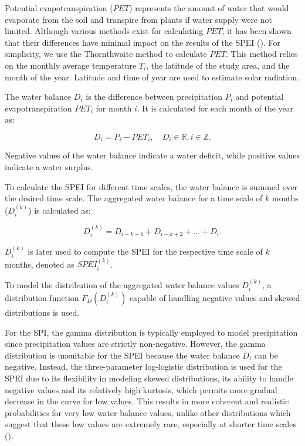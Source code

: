 \documentclass[
]{krantz}
\begin{document}
Potential evapotranspiration (\(PET\)) represents the amount of water that would evaporate from the soil and transpire from plants if water supply were not limited. Although various methods exist for calculating \(PET\), it has been shown that their differences have minimal impact on the results of the SPEI (\citet{vicente}). For simplicity, we use the Thornthwaite method to calculate \(PET\). This method relies on the monthly average temperature \(T_i\), the latitude of the study area, and the month of the year. Latitude and time of year are used to estimate solar radiation.

The water balance \(D_i\) is the difference between precipitation \(P_i\) and potential evapotranspiration \(PET_i\) for month \(i\). It is calculated for each month of the year as:

\begin{equation}
D_i = P_i - PET_i, \quad D_i \in \mathbb{R}, i \in \mathbb{Z}.
\end{equation}

Negative values of the water balance indicate a water deficit, while positive values indicate a water surplus.

To calculate the SPEI for different time scales, the water balance is summed over the desired time scale.
The aggregated water balance for a time scale of \(k\) months (\(D^{(k)}_i\)) is calculated as:

\begin{equation}
D^{(k)}_i = D_{i-k+1} + D_{i-k+2} + \ldots + D_i.
\end{equation}

\(D_i^{(k)}\) is later used to compute the SPEI for the respective time scale of \(k\) months, denoted as \(SPEI_i^{(k)}\).

To model the distribution of the aggregated water balance values \(D^{(k)}_i\), a distribution function \(F_D(D_i^{(k)})\) capable of handling negative values and skewed distributions is used.

For the SPI, the gamma distribution is typically employed to model precipitation since precipitation values are strictly non-negative.
However, the gamma distribution is unsuitable for the SPEI because the water balance \(D_i\) can be negative. Instead, the three-parameter log-logistic distribution is used for the SPEI due to its flexibility in modeling skewed distributions, its ability to handle negative values and its relatively high kurtosis, which permits more gradual decrease in the curve for low values.
This results in more coherent and realistic probabilities for very low water balance values, unlike other distributions which suggest that these low values are extremely rare, especially at shorter time scales (\citet{vicente}).
\end{document}
